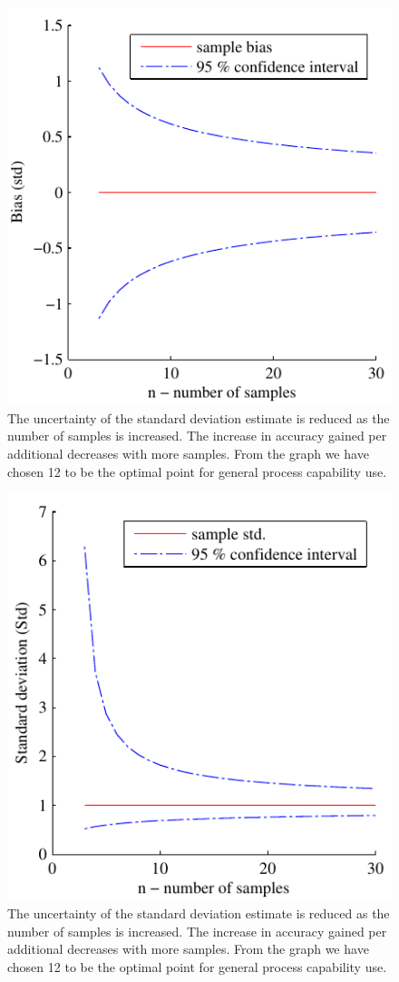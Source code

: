 \documentclass[aip,amsmath, reprint, author-year]{revtex4-1}
\begin{document}
\begin{figure}
\includegraphics{stats_bias_confidence.pdf}
\caption{\label{fig:std_uncertainty}The uncertainty of the standard deviation estimate is reduced as the number of samples is increased. The increase in accuracy gained per additional decreases with more samples. From the graph we have chosen 12 to be the optimal point for general process capability use.}
\end{figure}



\begin{figure}
\includegraphics{stats_std_confidence.pdf}
\caption{\label{fig:std_uncertainty}The uncertainty of the standard deviation estimate is reduced as the number of samples is increased. The increase in accuracy gained per additional decreases with more samples. From the graph we have chosen 12 to be the optimal point for general process capability use.}
\end{figure}
\end{document}
